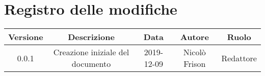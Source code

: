 \section*{Registro delle modifiche}

\begin{center}
	\begin{longtable}{|c|c|c|c|c|}
	\hline
	\rowcolor{lighter-grayer}
	\textbf{Versione} & \textbf{Descrizione} & \textbf{Data} & \textbf{Autore} & \textbf{Ruolo} \\
	\hline
	\endfirsthead


	\hline
	0.0.1 & Creazione iniziale del documento & 2019-12-09 & Nicolò Frison & Redattore \\
	\hline

	\end{longtable}
\end{center}